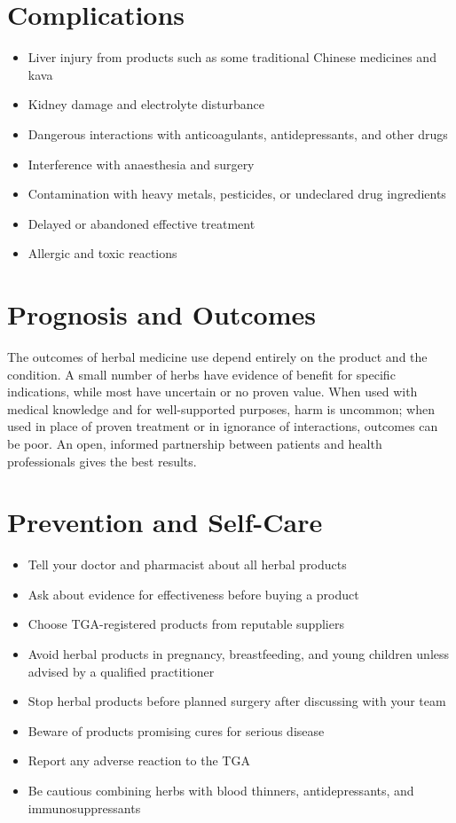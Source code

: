 \section*{Complications}
\begin{itemize}
    \item Liver injury from products such as some traditional Chinese medicines and kava
    \item Kidney damage and electrolyte disturbance
    \item Dangerous interactions with anticoagulants, antidepressants, and other drugs
    \item Interference with anaesthesia and surgery
    \item Contamination with heavy metals, pesticides, or undeclared drug ingredients
    \item Delayed or abandoned effective treatment
    \item Allergic and toxic reactions
\end{itemize}

\section*{Prognosis and Outcomes}
The outcomes of herbal medicine use depend entirely on the product and the condition. A small number of herbs have evidence of benefit for specific indications, while most have uncertain or no proven value. When used with medical knowledge and for well-supported purposes, harm is uncommon; when used in place of proven treatment or in ignorance of interactions, outcomes can be poor. An open, informed partnership between patients and health professionals gives the best results.

\section*{Prevention and Self-Care}
\begin{itemize}
    \item Tell your doctor and pharmacist about all herbal products
    \item Ask about evidence for effectiveness before buying a product
    \item Choose TGA-registered products from reputable suppliers
    \item Avoid herbal products in pregnancy, breastfeeding, and young children unless advised by a qualified practitioner
    \item Stop herbal products before planned surgery after discussing with your team
    \item Beware of products promising cures for serious disease
    \item Report any adverse reaction to the TGA
    \item Be cautious combining herbs with blood thinners, antidepressants, and immunosuppressants
\end{itemize}

